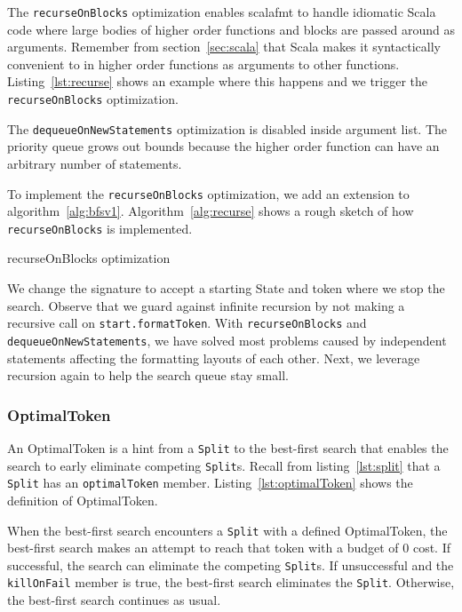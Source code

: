 The \texttt{recurseOnBlocks} optimization enables scalafmt to handle idiomatic Scala code where large bodies of higher order functions and blocks are passed around as arguments.
Remember from section~\ref{sec:scala} that  Scala makes it syntactically convenient to in higher order functions as arguments to other functions.
Listing~\ref{lst:recurse} shows an example where this happens and we trigger the \texttt{recurseOnBlocks} optimization.

The \texttt{dequeueOnNewStatements} optimization is disabled inside argument list.
The priority queue grows out bounds because the higher order function can have an arbitrary number of statements.

To implement the \texttt{recurseOnBlocks} optimization, we add an extension to algorithm~\ref{alg:bfsv1}.
Algorithm~\ref{alg:recurse} shows a rough sketch of how \texttt{recurseOnBlocks} is implemented.
\begin{algorithm}
\caption{recurseOnBlocks optimization}\label{alg:recurse}
  
\end{algorithm}
We change the signature to accept a starting State and token where we stop the search.
Observe that we guard against infinite recursion by not making a recursive call on \texttt{start.formatToken}.
With \texttt{recurseOnBlocks} and \texttt{dequeueOnNewStatements}, we have solved most problems caused by independent statements affecting the formatting layouts of each other.
Next, we leverage recursion again to help the search queue stay small.

\subsubsection{OptimalToken}\label{sec:optimal}
An OptimalToken is a hint from a \texttt{Split} to the best-first search that enables the search to early eliminate competing \texttt{Split}s.
Recall from listing~\ref{lst:split} that a \texttt{Split} has an \texttt{optimalToken} member.
Listing~\ref{lst:optimalToken} shows the definition of OptimalToken.

When the best-first search encounters a \texttt{Split} with a defined OptimalToken,
the best-first search makes an attempt to reach that token with a budget of 0 cost.
If successful, the search can eliminate the competing \texttt{Split}s.
If unsuccessful and the \texttt{killOnFail} member is true, the best-first search eliminates the \texttt{Split}.
Otherwise, the best-first search continues as usual.

